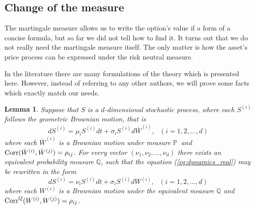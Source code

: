 \documentclass[a4paper,11pt, twoside]{book}
\newtheorem{lemma}[thm]{Lemma}
\theoremstyle{definition}
\theoremstyle{remark}
\def\P{{\mathbb{P}}\,}
\def\Corr{{\hbox{Corr}}}
\begin{document}
\subsection{Change of the measure}
The martingale measure allows us to write the option's value if a form of a concise formula, but so far we did not tell how to find it. It turns out that we do not really need the martingale measure itself. The only matter is how the asset's price process can be expressed under the risk neutral measure. 

In the literature there are many formulations of the theory which is presented here. However, instead of referring to any other authors, we will prove some facts which exactly match our needs.

\begin{lemma}
\label{lemma:measure_change}
 Suppose that $S$ is a $d$-dimensional stochastic process, where each $S^{(i)}$ follows the geometric Brownian motion, that is
 \begin{equation}
  \label{eq:dynamics_real}
  dS^{(i)} = \mu_i S^{(i)} dt + \sigma_i S^{(i)} d\bar{W}^{(i)},\ \ \ (i=1,2,\ldots,d)
 \end{equation}
 where each $\bar{W}^{(i)}$ is a Brownian motion under measure $\P$ and $\Corr(\bar{W}^{(i)}, \bar{W}^{(j)}) = \rho_{ij}$. For every vector $(\nu_1, \nu_2, \ldots, \nu_d)$ there exists an equivalent probability measure $\mathbb{Q}$, such that the equation (\ref{eq:dynamics_real}) may be rewritten in the form
  \begin{equation}
  dS^{(i)} = \nu_i S^{(i)} dt + \sigma_i S^{(i)} dW^{(i)},\ \ \ (i=1,2,\ldots,d)
 \end{equation}
 where each $W^{(i)}$ is a Brownian motion under the equivalent measure $\mathbb{Q}$ and\\ $\Corr^Q(W^{(i)}, W^{(j)}) = \rho_{ij}$.
\end{lemma}
\end{document}
